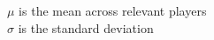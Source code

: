 \documentclass[preview]{standalone}
\begin{document}
\begin{center}
$\mu$ is the mean across relevant players \\ $\sigma$ is the standard deviation
\end{center}
\end{document}
